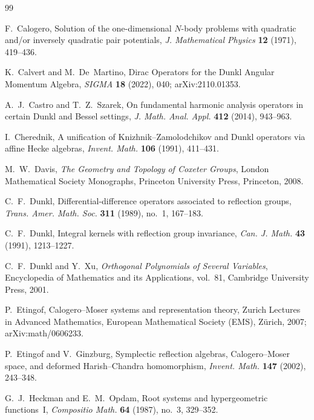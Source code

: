 \documentclass[12pt]{article}
\newcommand{\1}{\mathbbm{1}}
\theoremstyle{definition}
\begin{document}
\begin{thebibliography}{99}

F.~Calogero,
\newblock Solution of the one-dimensional \(N\)-body problems with quadratic and/or inversely quadratic pair potentials,
\newblock \emph{J. Mathematical Physics} \textbf{12} (1971), 419--436.

K.~Calvert and M.~De~Martino,
\newblock Dirac Operators for the Dunkl Angular Momentum Algebra,
\newblock \emph{SIGMA} \textbf{18} (2022), 040; arXiv:2110.01353.

A.~J.~Castro and T.~Z.~Szarek,
\newblock On fundamental harmonic analysis operators in certain Dunkl and Bessel settings,
\newblock \emph{J. Math. Anal. Appl.} \textbf{412} (2014), 943--963.

I.~Cherednik,
\newblock A unification of Knizhnik--Zamolodchikov and Dunkl operators via affine Hecke algebras,
\newblock \emph{Invent. Math.} \textbf{106} (1991), 411--431.

M.~W.~Davis,
\newblock \emph{The Geometry and Topology of Coxeter Groups},
\newblock London Mathematical Society Monographs, Princeton University Press, Princeton, 2008.

C.~F.~Dunkl,
\newblock Differential-difference operators associated to reflection groups,
\newblock \emph{Trans. Amer. Math. Soc.} \textbf{311} (1989), no.~1, 167--183.

C.~F.~Dunkl,
\newblock Integral kernels with reflection group invariance,
\newblock \emph{Can. J. Math.} \textbf{43} (1991), 1213--1227.

C.~F.~Dunkl and Y.~Xu,
\newblock \emph{Orthogonal Polynomials of Several Variables},
\newblock Encyclopedia of Mathematics and its Applications, vol.~81,
Cambridge University Press, 2001.

P.~Etingof,
\newblock Calogero--Moser systems and representation theory,
\newblock Zurich Lectures in Advanced Mathematics, European Mathematical Society (EMS), Zürich, 2007; arXiv:math/0606233.

P.~Etingof and V.~Ginzburg,
\newblock Symplectic reflection algebras, Calogero--Moser space, and deformed Harish--Chandra homomorphism,
\newblock \emph{Invent. Math.} \textbf{147} (2002), 243--348.

G.~J.~Heckman and E.~M.~Opdam,
\newblock Root systems and hypergeometric functions~I,
\newblock \emph{Compositio Math.} \textbf{64} (1987), no.~3, 329--352.


\end{thebibliography}
\end{document}
